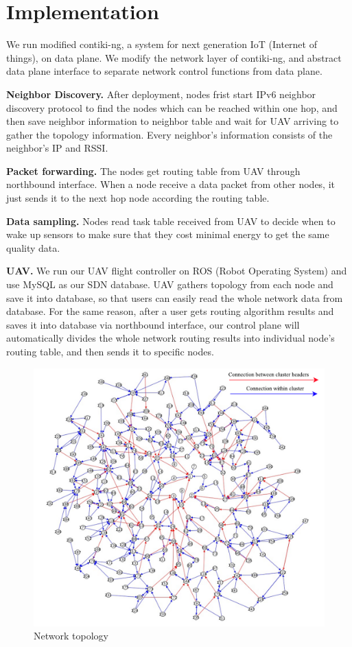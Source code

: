 \section{Implementation}
\label{Imp}

We run modified contiki-ng, a system for next generation IoT (Internet of
things), on data plane. We modify the network layer of contiki-ng, and abstract
data plane interface to separate network control functions from data plane. 

\textbf{Neighbor Discovery.} After deployment, nodes frist start IPv6 neighbor
discovery protocol to find the nodes which can be reached within one hop, and
then save neighbor information to neighbor table and wait for UAV arriving to
gather the topology information. Every neighbor's information consists of the
neighbor's IP and RSSI. 

\textbf{Packet forwarding.} The nodes get routing table from UAV through
northbound interface. When a node receive a data packet from other nodes, it
just sends it to the next hop node according the routing table.

\textbf{Data sampling.} Nodes read task table received from UAV to decide when
to wake up sensors to make sure that they cost minimal energy to get the same
quality data. 

\textbf{UAV.} We run our UAV flight controller on ROS (Robot Operating System)
and use MySQL as our SDN database. UAV gathers topology from each node and save
it into database, so that users can easily read the whole network data from
database. For the same reason, after a user gets routing algorithm results and
saves it into database via northbound interface, our control plane will
automatically divides the whole network routing results into individual node's
routing table, and then sends it to specific nodes.

\begin{figure}[htbp]
	\centering
	\includegraphics[width=.85\columnwidth]{Figure/topology}
	\vspace{-0.1in}
	\caption{Network topology}
	\label{topology}
	\vspace{-0.1in}
\end{figure}

